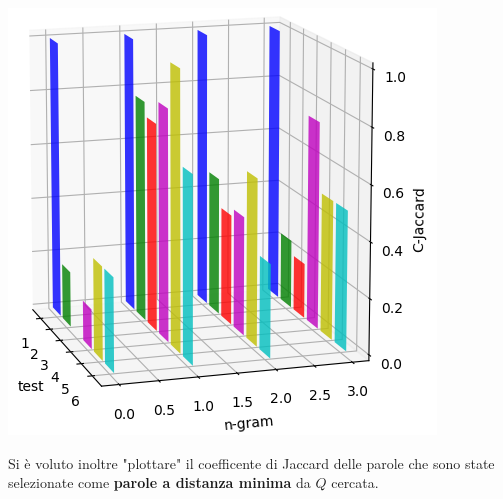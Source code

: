 \documentclass{article}
\begin{document}
\begin{center}
\begin{minipage}{0.48\linewidth}
\end{minipage}%
\hfill
\begin{minipage}{0.48\linewidth}
    \includegraphics[width=\linewidth]{img/jc_280K.png}
\end{minipage}%
\end{center}

Si è voluto inoltre "plottare" il coefficente di Jaccard delle parole che sono state selezionate come \textbf{parole a distanza minima} da $Q$ cercata.
\end{document}
